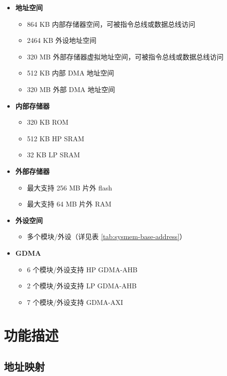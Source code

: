 \documentclass[main\_\_CN.tex]{subfiles}
\begin{document}
\begin{itemize}
    \item {\bfseries 地址空间}
        \begin{itemize}
    	    \item 864 KB 内部存储器空间，可被指令总线或数据总线访问
    	    \item 2464 KB 外设地址空间
    	    \item 320 MB 外部存储器虚拟地址空间，可被指令总线或数据总线访问
    	    \item 512 KB 内部 DMA 地址空间
                \item 320 MB 外部 DMA 地址空间
        \end{itemize}
    \item {\bfseries 内部存储器}
        \begin{itemize}
            \item 320 KB ROM
	        \item 512 KB HP SRAM
	        \item 32 KB LP SRAM
	    \end{itemize}
    \item {\bfseries 外部存储器}
        \begin{itemize}
            \item 最大支持 256 MB 片外 flash
            \item 最大支持 64 MB 片外 RAM
	    \end{itemize}
    \item \textbf{外设空间}
        \begin{itemize}
           \item 多个模块/外设（详见表 \ref{tab:sysmem-base-address}）
        \end{itemize}
    \item {\bfseries GDMA}
        \begin{itemize}
            \item 6 个模块/外设支持 HP GDMA-AHB
            \item 2 个模块/外设支持 LP GDMA-AHB
            \item 7 个模块/外设支持 GDMA-AXI
        \end{itemize}
\end{itemize}

\section{功能描述}

\subsection{地址映射}
\end{document}
